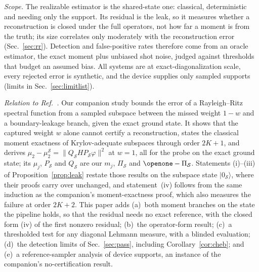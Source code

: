 \documentclass[aps,prb,reprint,onecolumn,12pt,superscriptaddress,longbibliography,floatfix]{revtex4-2}
\begin{document}
\emph{Scope.} The realizable estimator is the shared-state one: classical, deterministic and needing only the support. Its residual is the leak, so it measures whether a reconstruction is closed under the full operators, not how far a moment is from the truth; its size correlates only moderately with the reconstruction error (Sec.~\ref{sec:rr}). Detection and false-positive rates therefore come from an oracle estimator, the exact moment plus unbiased shot noise, judged against thresholds that budget an assumed bias. All systems are at exact-diagonalization scale, every rejected error is synthetic, and the device supplies only sampled supports (limits in Sec.~\ref{sec:limitlist}).

\emph{Relation to Ref.~\cite{SQDspec2608}.} Our companion study bounds the error of a Rayleigh--Ritz spectral function from a sampled subspace between the missed weight $1-w$ and a boundary-leakage branch, given the exact ground state. It shows that the captured weight $w$ alone cannot certify a reconstruction, states the classical moment exactness of Krylov-adequate subspaces through order $2K+1$, and derives ${\mu_2-\mu_2^{\mathcal S}=\lVert Q_{\mathcal S}HP_{\mathcal S}\varphi\rVert^2}$ at $w=1$, all for the probe on the exact ground state; its $\mu_j$, $P_\mathcal S$ and $Q_\mathcal S$ are our $m_j$, $\Pi_\mathcal S$ and $\openone-\Pi_\mathcal S$. Statements (i)--(iii) of Proposition~\ref{prop:leak} restate those results on the subspace state $|0_\mathcal S\rangle$, where their proofs carry over unchanged, and statement~(iv) follows from the same induction as the companion's moment-exactness proof, which also measures the failure at order $2K+2$. This paper adds (a)~both moment branches on the state the pipeline holds, so that the residual needs no exact reference, with the closed form (iv) of the first nonzero residual; (b)~the operator-form result; (c)~a thresholded test for any diagonal Lehmann measure, with a blinded evaluation; (d)~the detection limits of Sec.~\ref{sec:pass}, including Corollary~\ref{cor:cheb}; and (e)~a reference-sampler analysis of device supports, an instance of the companion's no-certification result.
\end{document}
